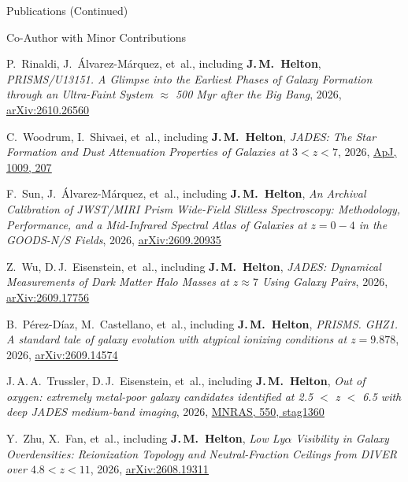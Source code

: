 \documentclass{JMH_CV}
\begin{document}
\begin{rSection}{Publications (Continued)}
\begin{rSubsection}{Co-Author with Minor Contributions}{}{}{}
\begin{etaremune}
    \item P.~Rinaldi, J.~\'{A}lvarez-M\'{a}rquez, et~al., including \textbf{J.\,M.~Helton}, \textit{PRISMS/U13151. A Glimpse into the Earliest Phases of Galaxy Formation through an Ultra-Faint System $\approx$ 500 Myr after the Big Bang}, 2026, \href{https://www.scixplorer.org/abs/2026arXiv261026560R/abstract}{\ul{arXiv:2610.26560}}

    \item C.~Woodrum, I.~Shivaei, et~al., including \textbf{J.\,M.~Helton}, \textit{JADES: The Star Formation and Dust Attenuation Properties of Galaxies at $\mathit{3 < z < 7}$}, 2026, \href{https://www.scixplorer.org/abs/2026ApJ..1009..207W/abstract}{\ul{ApJ, 1009, 207}}

    \item F.~Sun, J.~\'{A}lvarez-M\'{a}rquez, et~al., including \textbf{J.\,M.~Helton}, \textit{An Archival Calibration of JWST/MIRI Prism Wide-Field Slitless Spectroscopy: Methodology, Performance, and a Mid-Infrared Spectral Atlas of Galaxies at $\mathit{z = 0-4}$ in the GOODS-N/S Fields}, 2026, \href{https://www.scixplorer.org/abs/2026arXiv260920935S/abstract}{\ul{arXiv:2609.20935}}

    \item Z.~Wu, D.\,J.~Eisenstein, et~al., including \textbf{J.\,M.~Helton}, \textit{JADES: Dynamical Measurements of Dark Matter Halo Masses at $\mathit{z \approx 7}$ Using Galaxy Pairs}, 2026, \href{https://www.scixplorer.org/abs/2026arXiv260917756W/abstract}{\ul{arXiv:2609.17756}}

    \item B.~P\'{e}rez-D\'{i}az, M.~Castellano, et~al., including \textbf{J.\,M.~Helton}, \textit{PRISMS. GHZ1. A standard tale of galaxy evolution with atypical ionizing conditions at $\mathit{z = 9.878}$}, 2026, \href{https://www.scixplorer.org/abs/2026arXiv260914574P/abstract}{\ul{arXiv:2609.14574}}

    \item J.\,A.\,A.~Trussler, D.\,J.~Eisenstein, et~al., including \textbf{J.\,M.~Helton}, \textit{Out of oxygen: extremely metal-poor galaxy candidates identified at 2.5 $\mathit{<}$ z $\mathit{<}$ 6.5 with deep JADES medium-band imaging}, 2026, \href{https://www.scixplorer.org/abs/2026MNRAS.550g1360T/abstract}{\ul{MNRAS, 550, stag1360}}

    \item Y.~Zhu, X.~Fan, et~al., including \textbf{J.\,M.~Helton}, \textit{Low Ly$\mathit{\alpha}$ Visibility in Galaxy Overdensities: Reionization Topology and Neutral-Fraction Ceilings from DIVER over $\mathit{4.8 < z < 11}$}, 2026, \href{https://www.scixplorer.org/abs/2026arXiv260819311Z/abstract}{\ul{arXiv:2608.19311}}


\end{etaremune}
\end{rSubsection}
\end{rSection}
\end{document}

